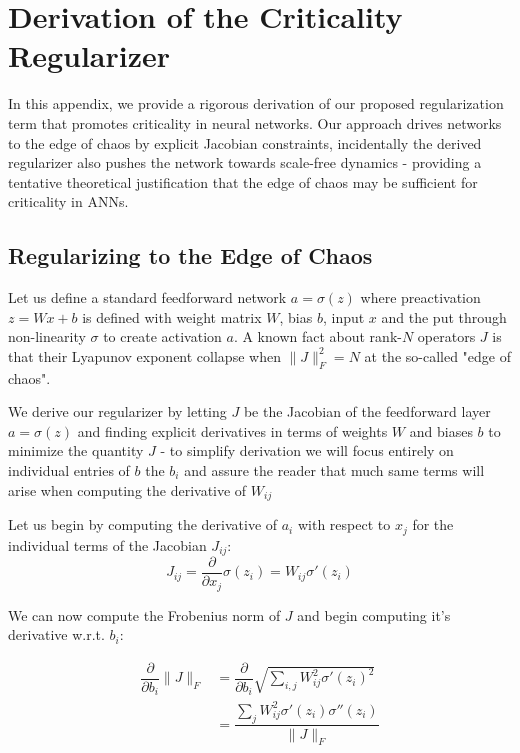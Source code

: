 \section{Derivation of the Criticality Regularizer}

In this appendix, we provide a rigorous derivation of our proposed regularization term that promotes criticality in neural networks. Our approach drives networks to the edge of chaos by explicit Jacobian constraints, incidentally the derived regularizer also pushes the network towards scale-free dynamics - providing a  tentative theoretical justification that the edge of chaos may be sufficient for criticality in ANNs.

\subsection{Regularizing to the Edge of Chaos}

Let us define a standard feedforward network $a=\sigma(z)$ where preactivation $z=Wx+b$ is defined with weight matrix $W$, bias $b$, input $x$ and the put through non-linearity $\sigma$ to create activation $a$. A known fact about rank-$N$ operators $J$ is that their Lyapunov exponent collapse when $\|J\|_F^2 = N$ at the so-called "edge of chaos".

We derive our regularizer by letting $J$ be the Jacobian of the feedforward layer $a=\sigma(z)$ and finding explicit derivatives in terms of weights $W$ and biases $b$ to minimize the quantity $J$ - to simplify derivation we will focus entirely on individual entries of $b$ the $b_i$ and assure the reader that much same terms will arise when computing the derivative of $W_{ij}$

Let us begin by computing the derivative of $a_i$ with respect to $x_j$ for the individual terms of the Jacobian $J_{ij}$:
\begin{equation}
J_{ij}=\dfrac{\partial}{\partial x_j} \sigma(z_i) = W_{ij}\sigma'(z_i)
\end{equation}

We can now compute the Frobenius norm of $J$ and begin computing it's derivative w.r.t. $b_i$:

\begin{align}
\dfrac{\partial}{\partial b_i}\|J\|_F &= \dfrac{\partial}{\partial b_i} \sqrt{\sum_{i,j}W_{ij}^2\sigma'(z_i)^2}\\
&= \dfrac{\sum_{j} W_{ij}^2 \sigma'(z_i) \sigma''(z_i)}{\|J\|_F}
\end{align}

